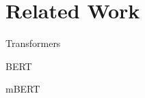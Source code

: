 \section{Related Work}
\label{sec:relatedwork}

Transformers \cite{Transformers}

BERT \cite{BERT}

mBERT \cite{mBERT}

